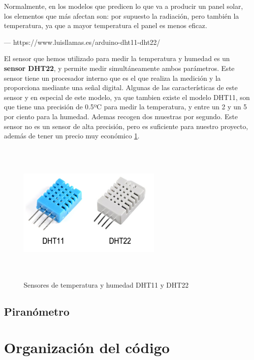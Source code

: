 Normalmente, en los modelos que predicen lo que va a producir un panel solar, los elementos que más afectan son: por supuesto la radiación, pero también la temperatura, ya que a mayor temperatura el panel es menos eficaz. 

--- https://www.luisllamas.es/arduino-dht11-dht22/

El sensor que hemos utilizado para medir la temperatura y humedad es un \textbf{sensor DHT22}, y permite medir simultáneamente ambos parámetros. 
Este sensor tiene un procesador interno que es el que realiza la medición y la proporciona mediante una señal digital.
Algunas de las características de este sensor y en especial de este modelo, ya que tambien existe el modelo DHT11, son que tiene una precisión de 0.5ºC para medir la temperatura, y entre un 2 y un 5 por ciento para la humedad. Ademas recogen dos muestras por segundo. Este sensor no es un sensor de alta precisión, pero es suficiente para nuestro proyecto, además de tener un precio muy económico \ref{sensor}.

 \begin{figure}[htb]
	
	\begin{center}
		\includegraphics[width=7cm,height=7cm]{figures/sensorTemperaturaHumedad.png}
		\caption{Sensores de temperatura y humedad DHT11 y DHT22}
	\end{center}
	
	\label{sensor}
\end{figure} 

\subsection{Piranómetro}

\section{Organización del código}
\label{makereference4.3} 

